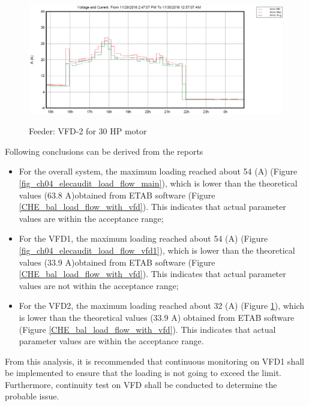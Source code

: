 \begin{figure}[!htb]
	\includegraphics[width=\textwidth]{figures/fig_ch04_elecaudit_load_flow_vfd2.pdf} \\
	\caption{Feeder: VFD-2 for 30 HP motor}
	\label{fig_ch04_elecaudit_load_flow_vfd2} 
\end{figure}

Following conclusions can be derived from the reports

\begin{itemize}
\item For the overall system, the maximum loading reached about 54 (A) (Figure \ref{fig_ch04_elecaudit_load_flow_main}), which is lower than the theoretical values (63.8 A)obtained from ETAB software (Figure \ref{CHE_bal_load_flow_with_vfd}). This indicates that actual parameter values are within the acceptance range;

\item For the VFD1, the maximum loading reached about 54 (A) (Figure \ref{fig_ch04_elecaudit_load_flow_vfd1}), which is lower than the theoretical values (33.9 A)obtained from ETAB software (Figure \ref{CHE_bal_load_flow_with_vfd}). This indicates that actual parameter values are not within the acceptance range;

\item For the VFD2, the maximum loading reached about 32 (A) (Figure \ref{fig_ch04_elecaudit_load_flow_vfd2}), which is lower than the theoretical values (33.9 A) obtained from ETAB software (Figure \ref{CHE_bal_load_flow_with_vfd}). This indicates that actual parameter values are within the acceptance range.

\end{itemize}

From this analysis, it is recommended that continuous monitoring on VFD1 shall be implemented to ensure that the loading is not going to exceed the limit. Furthermore, continuity test on VFD shall be conducted to determine the probable issue. 


